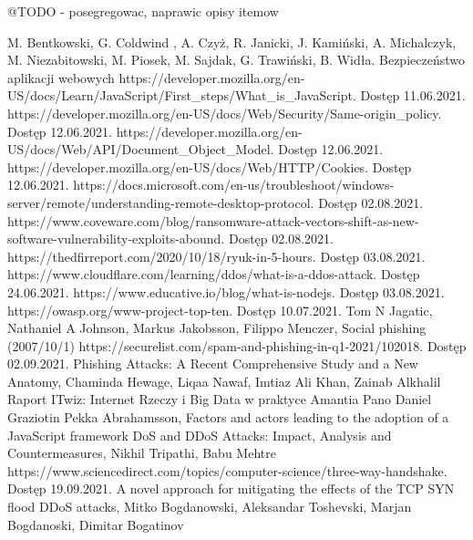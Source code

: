 \documentclass[12pt,twoside]{article}
\begin{document}
{

@TODO - posegregowac, naprawic opisy itemow

\begin{thebibliography}{4}
	
 M. Bentkowski, G. Coldwind , A. Czyż, R. Janicki, J. Kamiński, A. Michalczyk, M. Niezabitowski, M. Piosek, M. Sajdak, G. Trawiński, B. Widła. Bezpieczeństwo aplikacji webowych
 https://developer.mozilla.org/en-US/docs/Learn/JavaScript/First{\_}steps/What{\_}is{\_}JavaScript. Dostęp 11.06.2021.
 https://developer.mozilla.org/en-US/docs/Web/Security/Same-origin{\_}policy. Dostęp 12.06.2021.
 https://developer.mozilla.org/en-US/docs/Web/API/Document{\_}Object{\_}Model. Dostęp 12.06.2021. 
 https://developer.mozilla.org/en-US/docs/Web/HTTP/Cookies. Dostęp 12.06.2021.
 https://docs.microsoft.com/en-us/troubleshoot/windows-server/remote/understanding-remote-desktop-protocol. Dostęp 02.08.2021.
 https://www.coveware.com/blog/ransomware-attack-vectors-shift-as-new-software-vulnerability-exploits-abound. Dostęp 02.08.2021.
 https://thedfirreport.com/2020/10/18/ryuk-in-5-hours. Dostęp 03.08.2021.
 https://www.cloudflare.com/learning/ddos/what-is-a-ddos-attack. Dostęp 24.06.2021.
 https://www.educative.io/blog/what-is-nodejs. Dostęp 03.08.2021.
 https://owasp.org/www-project-top-ten. Dostęp 10.07.2021.
 Tom N Jagatic, Nathaniel A Johnson, Markus Jakobsson, Filippo Menczer, Social phishing (2007/10/1)
 https://securelist.com/spam-and-phishing-in-q1-2021/102018. Dostęp 02.09.2021.
 Phishing Attacks: A Recent Comprehensive Study and a New Anatomy, Chaminda Hewage, Liqaa Nawaf, Imtiaz Ali Khan, Zainab Alkhalil
 Raport ITwiz: Internet Rzeczy i Big Data w praktyce
 Amantia Pano Daniel Graziotin Pekka Abrahamsson, Factors and actors leading to the adoption of a JavaScript framework 
 DoS and DDoS Attacks: Impact, Analysis and Countermeasures, Nikhil Tripathi, Babu Mehtre
 https://www.sciencedirect.com/topics/computer-science/three-way-handshake. Dostęp 19.09.2021.
 A novel approach for mitigating the effects of the TCP SYN flood DDoS attacks, Mitko Bogdanowski, Aleksandar Toshevski, Marjan Bogdanoski, Dimitar Bogatinov

\end{thebibliography}}
\end{document}
